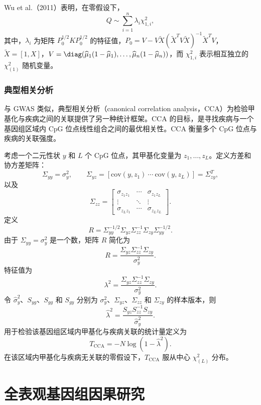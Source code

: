 Wu et al.（2011）表明，在零假设下，
\begin{equation}
Q\sim\sum_{i=1}^n\lambda_i\chi^2_{1,i},
\tag{5.6}
\end{equation}
其中，$\lambda_i$ 为矩阵 $P_0^{1/2}KP_0^{1/2}$ 的特征值，$P_0=V-V\widetilde X(\widetilde X^TV\widetilde X)^{-1}\widetilde X^TV$，$\widetilde X=[1,X]$，$V=\diag(\widehat\mu_1(1-\widehat\mu_1),\ldots,\widehat\mu_n(1-\widehat\mu_n))$，而 $\chi^2_{1,i}$ 表示相互独立的 $\chi^2_{(1)}$ 随机变量。

\subsubsection{典型相关分析}

与 GWAS 类似，典型相关分析（canonical correlation analysis，CCA）为检验甲基化与疾病之间的关联提供了另一种统计框架。CCA 的目标，是寻找疾病与一个基因组区域内 CpG 位点线性组合之间的最优相关性。CCA 衡量多个 CpG 位点与疾病的关联强度。

考虑一个二元性状 $y$ 和 $L$ 个 CpG 位点，其甲基化变量为 $z_1,\ldots,z_L$。定义方差和协方差矩阵：
\[
\Sigma_{yy}=\sigma_y^2,\qquad
\Sigma_{yz}=[\mathrm{cov}(y,z_1)\ \cdots\ \mathrm{cov}(y,z_L)]=\Sigma_{zy}^T,
\]
以及
\[
\Sigma_{zz}=\begin{bmatrix}
\sigma_{z_1z_1}&\cdots&\sigma_{z_1z_L}\\
\vdots&\ddots&\vdots\\
\sigma_{z_Lz_1}&\cdots&\sigma_{z_Lz_L}
\end{bmatrix}.
\]
定义
\[
R=\Sigma_{yy}^{-1/2}\Sigma_{yz}\Sigma_{zz}^{-1}\Sigma_{zy}\Sigma_{yy}^{-1/2}.
\]
由于 $\Sigma_{yy}=\sigma_y^2$ 是一个数，矩阵 $R$ 简化为
\[
R=\frac{\Sigma_{yz}\Sigma_{zz}^{-1}\Sigma_{zy}}{\sigma_y^2}.
\]
特征值为
\[
\lambda^2=\frac{\Sigma_{yz}\Sigma_{zz}^{-1}\Sigma_{zy}}{\sigma_y^2}.
\]
令 $\widehat\sigma_y^2$、$S_{yg}$、$S_{gg}$ 和 $S_{gy}$ 分别为 $\sigma_y^2$、$\Sigma_{yz}$、$\Sigma_{zz}$ 和 $\Sigma_{zy}$ 的样本版本，则
\[
\widehat\lambda^2=\frac{S_{yz}S_{zz}^{-1}S_{zy}}{\widehat\sigma_y^2}.
\]
用于检验该基因组区域内甲基化与疾病关联的统计量定义为
\begin{equation}
T_{\mathrm{CCA}}=-N\log(1-\widehat\lambda^2).
\tag{5.7}
\end{equation}
在该区域内甲基化与疾病无关联的零假设下，$T_{\mathrm{CCA}}$ 服从中心 $\chi^2_{(L)}$ 分布。

\section{全表观基因组因果研究}

